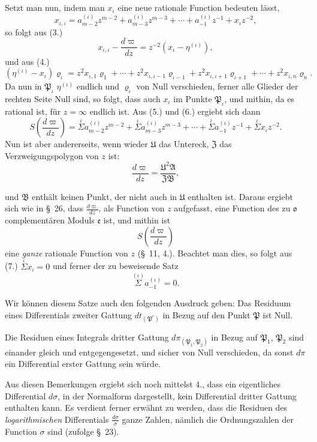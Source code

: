 \documentclass{article}
\begin{document}
Setzt man nun, indem man $x_{\iota}$ eine neue rationale Function bedeuten lässt,
\[ x_{\iota,\iota} = a_{m-2}^{(\iota)}z^{m-2}+a_{m-3}^{(\iota)}z^{m-3}+\cdots+a_{-1}^{(\iota)}z^{-1}+x_{\iota}z^{-2}, \tag{6.} \]
so folgt aus (3.)
\[ x_{\iota,\iota}-\frac{d\varpi}{dz} = z^{-2}(x_{\iota}-\eta^{(\iota)}), \]
und aus (4.)
\[ (\eta^{(\iota)}-x_{\iota})\varrho_{\iota} = z^{2}x_{\iota,1}\varrho_{1}+\cdots+z^{2}x_{\iota,\iota-1}\varrho_{\iota-1}+z^{2}x_{\iota,\iota+1}\varrho_{\iota+1}+\cdots+z^{2}x_{\iota,n}\varrho_{n}. \]
Da nun in $\mathfrak{P}_{\iota}$ $\eta^{(\iota)}$ endlich und $\varrho_{\iota}$ von Null verschieden, ferner alle Glieder der rechten Seite Null sind, so folgt, dass auch $x_{\iota}$ im Punkte $\mathfrak{P}_{\iota}$, und mithin, da es rational ist, für $z = \infty$ endlich ist. Aus (5.) und (6.) ergiebt sich dann
\[ S\left(\frac{d\varpi}{dz}\right) = \overset{\iota}{\Sigma} a_{m-2}^{(\iota)}z^{m-2}+\overset{\iota}{\Sigma} a_{m-3}^{(\iota)}z^{m-3}+\cdots+\overset{\iota}{\Sigma} a_{-1}^{(\iota)}z^{-1}+\overset{\iota}{\Sigma} x_{\iota}z^{-2}. \tag{7.} \]
Nun ist aber andererseits, wenn wieder $\mathfrak{U}$ das Untereck, $\mathfrak{Z}$ das Verzweigungspolygon von $z$ ist:
\[ \frac{d\varpi}{dz} = \frac{\mathfrak{U}^{2}\mathfrak{A}}{\mathfrak{Z}\mathfrak{B}}, \]

und $\mathfrak{B}$ enthält keinen Punkt, der nicht auch in $\mathfrak{U}$ enthalten ist. Daraus ergiebt sich wie in §~26, dass $\frac{d\varpi}{dz}$, als Function von $z$ aufgefasst, eine Function des zu $\mathfrak{o}$ complementären Moduls $\mathfrak{e}$ ist, und mithin ist
\[ S\left(\frac{d\varpi}{dz}\right) \]
eine \emph{ganze} rationale Function von $z$ (§~11, 4.). Beachtet man dies, so folgt aus (7.) $\overset{\iota}{\Sigma} x_{\iota} = 0$ und ferner der zu beweisende Satz
\[ \overset{(\iota)}{\Sigma} a_{-1}^{(\iota)} = 0. \]

Wir können diesem Satze auch den folgenden Ausdruck geben: Das Residuum eines Differentials zweiter Gattung $dt_{(\mathfrak{P}^{r})}$ in Bezug auf den Punkt $\mathfrak{P}$ ist Null.

Die Residuen eines Integrals dritter Gattung $d\pi_{(\mathfrak{P}_{1}, \mathfrak{P}_{2})}$ in Bezug auf $\mathfrak{P}_{1}$, $\mathfrak{P}_{2}$ sind einander gleich und entgegengesetzt, und sicher von Null verschieden, da sonst $d\pi$ ein Differential erster Gattung sein würde.

Aus diesen Bemerkungen ergiebt sich noch mittelst 4., dass ein eigentliches Differential $d\sigma$, in der Normalform dargestellt, kein Differential dritter Gattung enthalten kann. Es verdient ferner erwähnt zu werden, dass die Residuen des \emph{logarithmischen} Differentials $\frac{d\sigma}{\sigma}$ ganze Zahlen, nämlich die Ordnungszahlen der Function $\sigma$ sind (zufolge §~23).
\end{document}
